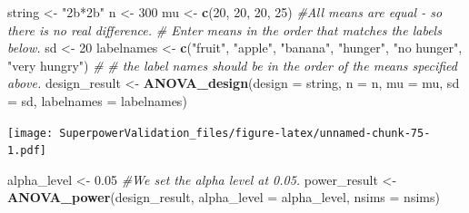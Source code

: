 \documentclass[]{book}
\newenvironment{Shaded}{\begin{snugshade}}{\end{snugshade}}
\newcommand{\CommentTok}[1]{\textcolor[rgb]{0.56,0.35,0.01}{\textit{#1}}}
\newcommand{\DataTypeTok}[1]{\textcolor[rgb]{0.13,0.29,0.53}{#1}}
\newcommand{\DecValTok}[1]{\textcolor[rgb]{0.00,0.00,0.81}{#1}}
\newcommand{\FloatTok}[1]{\textcolor[rgb]{0.00,0.00,0.81}{#1}}
\newcommand{\KeywordTok}[1]{\textcolor[rgb]{0.13,0.29,0.53}{\textbf{#1}}}
\newcommand{\NormalTok}[1]{#1}
\newcommand{\StringTok}[1]{\textcolor[rgb]{0.31,0.60,0.02}{#1}}
\begin{document}
\begin{Shaded}
\begin{Highlighting}[]
\NormalTok{string <-}\StringTok{ "2b*2b"}
\NormalTok{n <-}\StringTok{ }\DecValTok{300}
\NormalTok{mu <-}\StringTok{ }\KeywordTok{c}\NormalTok{(}\DecValTok{20}\NormalTok{, }\DecValTok{20}\NormalTok{, }\DecValTok{20}\NormalTok{, }\DecValTok{25}\NormalTok{) }\CommentTok{#All means are equal - so there is no real difference.}
\CommentTok{# Enter means in the order that matches the labels below.}
\NormalTok{sd <-}\StringTok{ }\DecValTok{20}
\NormalTok{labelnames <-}\StringTok{ }\KeywordTok{c}\NormalTok{(}\StringTok{"fruit"}\NormalTok{, }\StringTok{"apple"}\NormalTok{, }\StringTok{"banana"}\NormalTok{, }\StringTok{"hunger"}\NormalTok{, }\StringTok{"no hunger"}\NormalTok{, }\StringTok{"very hungry"}\NormalTok{) }\CommentTok{#}
\CommentTok{# the label names should be in the order of the means specified above.}
\NormalTok{design_result <-}\StringTok{ }\KeywordTok{ANOVA_design}\NormalTok{(}\DataTypeTok{design =}\NormalTok{ string,}
                   \DataTypeTok{n =}\NormalTok{ n, }
                   \DataTypeTok{mu =}\NormalTok{ mu, }
                   \DataTypeTok{sd =}\NormalTok{ sd, }
                   \DataTypeTok{labelnames =}\NormalTok{ labelnames)}
\end{Highlighting}
\end{Shaded}

\texttt{[image: SuperpowerValidation\_files/figure-latex/unnamed-chunk-75-1.pdf]}

\begin{Shaded}
\begin{Highlighting}[]
\NormalTok{alpha_level <-}\StringTok{ }\FloatTok{0.05} \CommentTok{#We set the alpha level at 0.05. }
\NormalTok{power_result <-}\StringTok{ }\KeywordTok{ANOVA_power}\NormalTok{(design_result, }\DataTypeTok{alpha_level =}\NormalTok{ alpha_level, }\DataTypeTok{nsims =}\NormalTok{ nsims)}
\end{Highlighting}
\end{Shaded}
\end{document}

